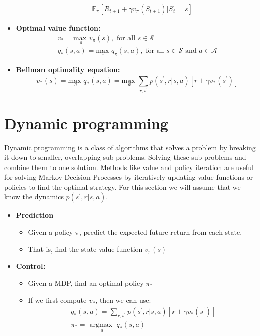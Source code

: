 \begin{wbox}{}
\begin{itemize}
\begin{equation}
\begin{aligned}
			= \mathbb{E}_\pi [R_{t+1}+\gamma v_\pi(S_{t+1})|S_t = s] 
		\end{aligned}
		\end{equation}
	\item \textbf{Optimal value function:}
		\begin{equation}
		 \begin{aligned}
		 	v_* = \underset{\pi}{\text{max }} v_\pi(s), \text{ for all } s \in \mathcal{S} \\
		 	q_* (s,a) = \underset{\pi}{\text{max }}q_\pi(s,a), \text{ for all } s \in \mathcal{S} \text{ and } a \in \mathcal{A}
		 \end{aligned}
		 \end{equation} 

	\item \textbf{Bellman optimality equation:}
	 \begin{equation}
	 v_*(s) = \underset{a}{\text{max }}q_*(s,a) = \underset{a}{\text{max }}\sum_{r, s^{\prime}}^{}p(s^{\prime},r|s,a)[r+\gamma v_*(s^{\prime})] 
	 \end{equation}
\end{itemize}
\end{wbox}

\section{Dynamic programming}
Dynamic programming is a class of algorithms that solves a problem by breaking it down to smaller, overlapping sub-problems. Solving these sub-problems and combine them to one solution. Methods like value and policy iteration are useful for solving Markov Decision Processes by iteratively updating value functions or policies to find the optimal strategy. For this section we will assume that we know the dynamics $p(s^{\prime},r|s,a)$. 

\begin{itemize}
	\item \textbf{Prediction} 
	\begin{itemize}
		\item Given a policy $\pi$, predict the expected future return from each state.
		\item That is, find the state-value function $v_\pi(s)$
	\end{itemize}
	\item \textbf{Control:}
	\begin{itemize}
		\item Given a MDP, find an optimal policy $\pi_*$
		\item If we first compute $v_*$, then we can use:
			\begin{equation}
			\begin{aligned}
				q_*(s,a) = \sum_{r, s^{\prime}}^{}p(s^{\prime},r|s,a)[r + \gamma v_*(s^{\prime})] \\
				\pi_* = \underset{a}{\arg \text{max } } q_*(s,a)
			\end{aligned}
			\end{equation}
	\end{itemize}
\end{itemize}


